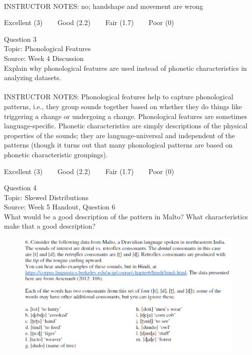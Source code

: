 \documentclass[12pt]{article}
\begin{document}
~\\
INSTRUCTOR NOTES: no; handshape and movement are wrong


\vfill
Excellent (3) ~~~ Good (2.2) ~~~ Fair (1.7) ~~~ Poor (0)
\newpage

{\large Question 3}\\

Topic: Phonological Features\\
Source: Week 4 Discussion\\

Explain why phonological features are used instead of phonetic characteristics in analyzing datasets.\\


~\\
INSTRUCTOR NOTES: Phonological features help to capture phonological patterns, i.e., they group sounds together based on whether they do things like triggering a change or undergoing a change. Phonological features are sometimes language-specific. Phonetic characteristics are simply descriptions of the physical properties of the sounds; they are language-universal and independent of the patterns (though it turns out that many phonological patterns are based on phonetic characteristic groupings).


\vfill
Excellent (3) ~~~ Good (2.2) ~~~ Fair (1.7) ~~~ Poor (0)
\newpage

{\large Question 4}\\

Topic: Skewed Distributions\\
Source: Week 5 Handout, Question 6\\

What would be a good description of the pattern in Malto? What characteristics make that a good description?\\

\begin{figure}[H]
\includegraphics{../images/malto.png}
\end{figure}
\end{document}
